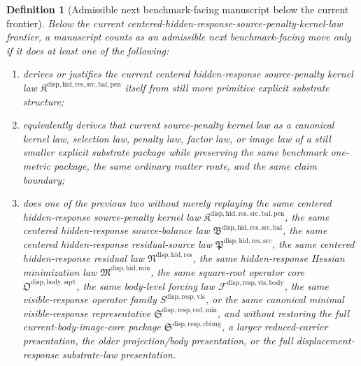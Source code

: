 \documentclass[11pt]{article}
\newcommand{\SourcePenaltyKernelLawPackage}{\mathfrak K^{\mathrm{disp,hid,res,src,bal,pen}}}
\newcommand{\SourceBalanceLawPackage}{\mathfrak B^{\mathrm{disp,hid,res,src,bal}}}
\newcommand{\ResidualSourceLawPackage}{\mathfrak P^{\mathrm{disp,hid,res,src}}}
\newcommand{\ResidualLawPackage}{\mathfrak N^{\mathrm{disp,hid,res}}}
\newcommand{\HiddenMinimizationPackage}{\mathfrak M^{\mathrm{disp,hid,min}}}
\newcommand{\SquareRootOperatorCore}{\mathfrak O^{\mathrm{disp,body,sqrt}}}
\newcommand{\VisibleBodyForcingLaw}{\mathscr F^{\mathrm{disp,resp,vis,body}}}
\newcommand{\VisibleResponseOperator}{S^{\mathrm{disp,resp,vis}}}
\newcommand{\MinimalReducedStructure}{\mathfrak S^{\mathrm{disp,resp,red,min}}}
\newcommand{\CurrentBodyImageCore}{\mathfrak S^{\mathrm{disp,resp,cbimg}}}
\newtheorem{definition}{Definition}
\begin{document}
\begin{definition}[Admissible next benchmark-facing manuscript below the current frontier]
Below the current centered-hidden-response-source-penalty-kernel-law frontier, a manuscript counts as an admissible next benchmark-facing move only if it does at least one of the following:
\begin{enumerate}
    \item derives or justifies the current centered hidden-response source-penalty kernel law \(\SourcePenaltyKernelLawPackage\) itself from still more primitive explicit substrate structure;
    \item equivalently derives that current source-penalty kernel law as a canonical kernel law, selection law, penalty law, factor law, or image law of a still smaller explicit substrate package while preserving the same benchmark one-metric package, the same ordinary matter route, and the same claim boundary;
    \item does one of the previous two without merely replaying the same centered hidden-response source-penalty kernel law \(\SourcePenaltyKernelLawPackage\), the same centered hidden-response source-balance law \(\SourceBalanceLawPackage\), the same centered hidden-response residual-source law \(\ResidualSourceLawPackage\), the same centered hidden-response residual law \(\ResidualLawPackage\), the same hidden-response Hessian minimization law \(\HiddenMinimizationPackage\), the same square-root operator core \(\SquareRootOperatorCore\), the same body-level forcing law \(\VisibleBodyForcingLaw\), the same visible-response operator family \(\VisibleResponseOperator\), or the same canonical minimal visible-response representative \(\MinimalReducedStructure\), and without restoring the full current-body-image-core package \(\CurrentBodyImageCore\), a larger reduced-carrier presentation, the older projection/body presentation, or the full displacement-response substrate-law presentation.
\end{enumerate}
\end{definition}
\end{document}
